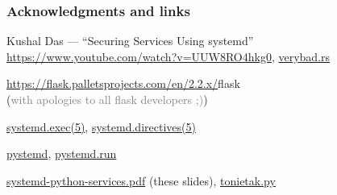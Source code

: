 \documentclass[]{beamer}
\begin{document}
\begin{frame}[fragile]
  \frametitle{Acknowledgments and links}

  Kushal Das — ``Securing Services Using systemd''\\
  \url{https://www.youtube.com/watch?v=UUW8RO4hkg0},
  \href{https://github.com/kushaldas/verybad/blob/main/src/main.rs}{verybad.rs}

  \vfill

  \url{https://flask.palletsprojects.com/en/2.2.x/}{flask}\\
  (\textcolor{gray}{with apologies to all flask developers ;)})

  \vfill

  \href{https://www.freedesktop.org/software/systemd/man/systemd.exec.html}{systemd.exec(5)},
  \href{https://www.freedesktop.org/software/systemd/man/systemd.directives.html}{systemd.directives(5)}

  \vfill

  \href{https://pypi.org/project/pystemd/}{pystemd},
  \href{https://github.com/facebookincubator/pystemd/blob/master/_docs/pystemd.run.md}{pystemd.run}

  \vfill

  \textcolor{teal}{\href{https://raw.githubusercontent.com/keszybz/securing-pyservices-using-systemd/main/systemd-python-services.pdf}{systemd-python-services.pdf}} (these slides),
  \textcolor{teal}{\href{https://github.com/keszybz/securing-pyservices-using-systemd/blob/main/service/tonietak.py}{tonietak.py}}
\end{frame}
\end{document}

